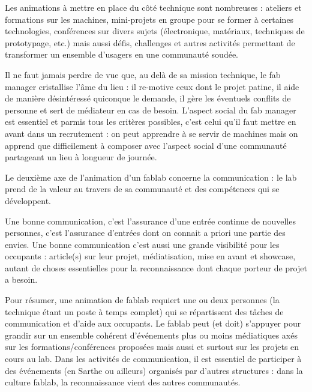 \documentclass[a4paper,10pt]{scrartcl}
\begin{document}
Les animations à mettre en place du côté technique sont nombreuses : ateliers et formations sur les machines, mini-projets en groupe pour se former à certaines technologies, conférences sur divers sujets (électronique, matériaux, techniques de prototypage, etc.) mais aussi défis, challenges et autres activités permettant de transformer un ensemble d'usagers en une communauté soudée.

Il ne faut jamais perdre de vue que, au delà de sa mission technique, le fab manager cristallise l'âme du lieu : il re-motive ceux dont le projet patine, il aide de manière désintéressé quiconque le demande, il gère les éventuels conflits de personne et sert de médiateur en cas de besoin. L'aspect social du fab manager est essentiel et parmis tous les critères possibles, c'est celui qu'il faut mettre en avant dans un recrutement : on peut apprendre à se servir de machines mais on apprend que difficilement à composer avec l'aspect social d'une communauté partageant un lieu à longueur de journée.

Le deuxième axe de l'animation d'un fablab concerne la communication : le lab prend de la valeur au travers de sa communauté et des compétences qui se développent.

Une bonne communication, c'est l'assurance d'une entrée continue de nouvelles personnes, c'est l'assurance d'entrées dont on connait a priori une partie des envies. Une bonne communication c'est aussi une grande visibilité pour les occupants : article(s) sur leur projet, médiatisation, mise en avant et showcase, autant de choses essentielles pour la reconnaissance dont chaque porteur de projet a besoin.

Pour résumer, une animation de fablab requiert une ou deux personnes (la technique étant un poste à temps complet) qui se répartissent des tâches de communication et d'aide aux occupants. Le fablab peut (et doit) s'appuyer pour grandir sur un ensemble cohérent d’événements plus ou moins médiatiques axés sur les formations/conférences proposées mais aussi et surtout sur les projets en cours au lab. Dans les activités de communication, il est essentiel de participer à des événements (en Sarthe ou ailleurs) organisés par d'autres structures : dans la culture fablab, la reconnaissance vient des autres communautés.
\end{document}
